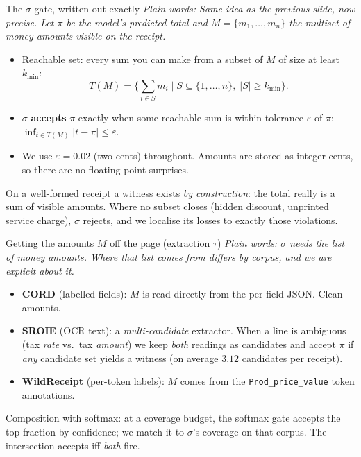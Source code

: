 \documentclass[aspectratio=169]{beamer}
\newcommand{\keybox}[1]{\begin{center}\colorbox{grey!15}{\parbox{0.92\linewidth}{\centering #1}}\end{center}}
\newcommand{\plain}[1]{\textit{\textcolor{sig}{Plain words:} #1}}
\begin{document}
\begin{frame}{The $\sigma$ gate, written out exactly}
\plain{Same idea as the previous slide, now precise. Let $\pi$ be
the model's predicted total and $M=\{m_1,\dots,m_n\}$ the multiset
of money amounts visible on the receipt.}
\vspace{0.4em}
\begin{itemize}
\item Reachable set: every sum you can make from a subset of $M$ of
size at least $k_{\min}$:
\[
T(M)=\Big\{\textstyle\sum_{i\in S} m_i \;\Big|\;
   S\subseteq\{1,\dots,n\},\; |S|\ge k_{\min}\Big\}.
\]
\item $\sigma$ \textbf{accepts} $\pi$ exactly when some reachable sum
is within tolerance $\varepsilon$ of $\pi$:
$\inf_{t\in T(M)}|t-\pi|\le\varepsilon$.
\item We use $\varepsilon=0.02$ (two cents) throughout. Amounts are
stored as integer cents, so there are no floating-point surprises.
\end{itemize}
\keybox{On a well-formed receipt a witness exists \emph{by
construction}: the total really is a sum of visible amounts. Where
no subset closes (hidden discount, unprinted service charge), $\sigma$
rejects, and we localise its losses to exactly those violations.}
\end{frame}

\begin{frame}{Getting the amounts $M$ off the page (extraction $\tau$)}
\plain{$\sigma$ needs the list of money amounts. Where that list
comes from differs by corpus, and we are explicit about it.}
\begin{itemize}
\item \textbf{CORD} (labelled fields): $M$ is read directly from the
per-field JSON. Clean amounts.
\item \textbf{SROIE} (OCR text): a \emph{multi-candidate} extractor.
When a line is ambiguous (tax \emph{rate} vs.\ tax \emph{amount}) we
keep \emph{both} readings as candidates and accept $\pi$ if
\emph{any} candidate set yields a witness (on average $3.12$
candidates per receipt).
\item \textbf{WildReceipt} (per-token labels): $M$ comes from the
\texttt{Prod\_price\_value} token annotations.
\end{itemize}
\keybox{Composition with softmax: at a coverage budget, the softmax
gate accepts the top fraction by confidence; we match it to
$\sigma$'s coverage on that corpus. The intersection accepts iff
\emph{both} fire.}
\end{frame}
\end{document}
